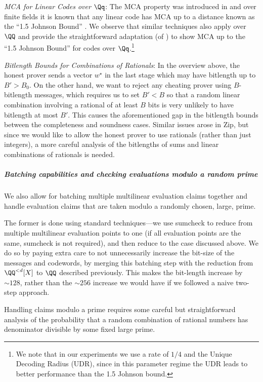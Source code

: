 \emph{MCA for Linear Codes over $\Qq$}: The MCA property was introduced in \cite{whir} and over finite fields it is known that any linear code has MCA up to a distance known as the ``1.5 Johnson Bound'' \cite{zei}. We observe that similar techniques also apply over $\QQ$ and provide the straightforward adaptation (of \cite{zei}) to show MCA up to the ``1.5 Johnson Bound'' for codes over $\Qq$.\footnote{We note that in our experiments we use a rate of $1/4$ and the Unique Decoding Radius (UDR), since in this parameter regime the UDR leads to better performance than the 1.5 Johnson bound.}

\emph{Bitlength Bounds for Combinations of Rationals}: In the overview above, the honest prover sends a vector $w^\star$ in the last stage which may have bitlength up to $B' > B_0$. On the other hand, we want to reject any cheating prover using $B$-bitlength messages, which requires us to set $B' < B$ so that a random linear combination involving a rational of at least $B$ bits is very unlikely to have bitlength at most $B'$. This causes the aforementioned gap in the bitlength bounds between the completeness and soundness cases. Similar issues arose in Zip, but since we would like to allow the honest prover to use rationals (rather than just integers), a more careful analysis of the bitlengths of sums and linear combinations of rationals is needed.

\subparagraph{Batching capabilities and checking evaluations modulo a random prime} We also allow for batching multiple multilinear evaluation claims together and handle evaluation claims that are taken modulo a randomly chosen, large, prime. 

The former is done using standard techniques---we use sumcheck to reduce from multiple multilinear evaluation points to one (if all evaluation points are the same, sumcheck is not required), and then reduce to the case discussed above. We do so by paying extra care to not unnecessarily increase the bit-size of the messages and codewords, by merging this batching step with the reduction from $\QQ^{<d}[X]$ to $\QQ$ described previously. This makes the bit-length increase by $\sim 128$, rather than the $\sim 256$ increase we would have if we followed a naive two-step approach.

Handling claims modulo a prime requires some careful but straightforward analysis of the probability that a random combination of rational numbers has denominator divisible by some fixed large prime.


